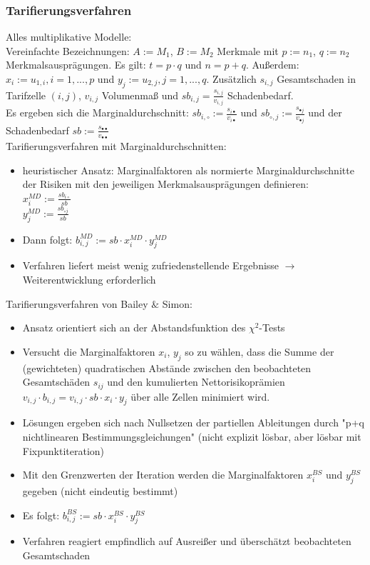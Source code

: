 \documentclass[12pt]{report}
\theoremstyle{dotless}
\theoremstyle{definition}
\begin{document}
\subsubsection{Tarifierungsverfahren}
Alles multiplikative Modelle: \\
Vereinfachte Bezeichnungen: $A:=M_1$, $B:=M_2$ Merkmale mit $p:=n_1$, $q:=n_2$ Merkmalsausprägungen. Es gilt: $t=p\cdot q$ und $n=p+q$. Außerdem: $x_i:=u_{1,i}, i=1, ...,p$ und $y_j:=u_{2,j}, j=1,...,q$. Zusätzlich $s_{i,j}$ Gesamtschaden in Tarifzelle $(i,j)$, $v_{i,j}$ Volumenmaß und $sb_{i,j}=\frac{s_{i,j}}{v_{i,j}}$ Schadenbedarf. \\
Es ergeben sich die Marginaldurchschnitt: $sb_{i,\circ}:=\frac{s_{i \bullet}}{v_{i\bullet}}$ und $sb_{\circ, j} := \frac{s_{\bullet j}}{v_{\bullet j}}$ und der Schadenbedarf $sb:=\frac{s_{\bullet \bullet}}{v_{\bullet \bullet}}$ \\
Tarifierungsverfahren mit Marginaldurchschnitten:
\begin{itemize}
\item heuristischer Ansatz: Marginalfaktoren als normierte Marginaldurchschnitte der Risiken mit den jeweiligen Merkmalsausprägungen definieren:\\
$x_i^{MD} := \frac{sb_{i\circ}}{sb}$ \\
$y_j^{MD} := \frac{sb_{\circ j}}{sb}$ 
\item Dann folgt: $b_{i,j}^{MD} := sb \cdot x_i^{MD} \cdot y_j^{MD}$
\item Verfahren liefert meist wenig zufriedenstellende Ergebnisse $\rightarrow$ Weiterentwicklung erforderlich
\end{itemize}
Tarifierungsverfahren von Bailey $\&$ Simon:
\begin{itemize}
\item Ansatz orientiert sich an der Abstandsfunktion des $\chi^2$-Tests
\item Versucht die Marginalfaktoren $x_i$, $y_j$ so zu wählen, dass die Summe der (gewichteten) quadratischen Abstände zwischen den beobachteten Gesamtschäden $s_{ij}$ und den kumulierten Nettorisikoprämien $v_{i,j}\cdot b_{i,j} = v_{i,j}\cdot sb \cdot x_i \cdot y_j$ über alle Zellen minimiert wird.
\item Lösungen ergeben sich nach Nullsetzen der partiellen Ableitungen durch "p+q nichtlinearen Bestimmungsgleichungen" (nicht explizit lösbar, aber lösbar mit Fixpunktiteration)
\item Mit den Grenzwerten der Iteration werden die Marginalfaktoren $x_i^{BS}$ und $y_j^{BS}$ gegeben (nicht eindeutig bestimmt)
\item Es folgt: $b_{i,j}^{BS} := sb \cdot x_i^{BS} \cdot y_j^{BS}$
\item Verfahren reagiert empfindlich auf Ausreißer und überschätzt beobachteten Gesamtschaden
\end{itemize}
\end{document}
